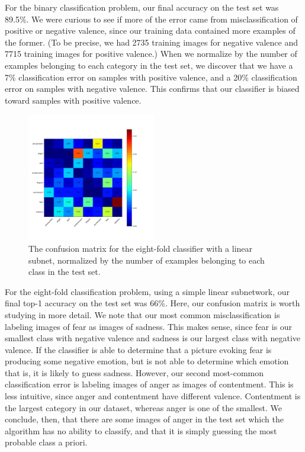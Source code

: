 \documentclass[10pt,twocolumn,letterpaper]{article}
\begin{document}
For the binary classification problem, our final accuracy on the test set was 89.5\%. We were curious to see if more of the error came from misclassification of positive or negative valence, since our training data contained more examples of the former. (To be precise, we had 2735 training images for negative valence and 7715 training images for positive valence.) When we normalize by the number of examples belonging to each category in the test set, we discover that we have a 7\% classification error on samples with positive valence, and a 20\% classification error on samples with negative valence. This confirms that our classifier is biased toward samples with positive valence.

\begin{figure}
\centering
\includegraphics[width=0.5\textwidth]{normalized_confusion_matrix_8_classes_no_hidden.png}
\caption{The confusion matrix for the eight-fold classifier with a linear subnet, normalized by the number of examples belonging to each class in the test set.}
\end{figure}

For the eight-fold classification problem, using a simple linear subnetwork, our final top-1 accuracy on the test set was 66\%. Here, our confusion matrix is worth studying in more detail. We note that our most common misclassification is labeling images of fear as images of sadness. This makes sense, since fear is our smallest class with negative valence and sadness is our largest class with negative valence. If the classifier is able to determine that a picture evoking fear is producing some negative emotion, but is not able to determine which emotion that is, it is likely to guess sadness. However, our second most-common classification error is labeling images of anger as images of contentment. This is less intuitive, since anger and contentment have different valence. Contentment is the largest category in our dataset, whereas anger is one of the smallest. We conclude, then, that there are some images of anger in the test set which the algorithm has no ability to classify, and that it is simply guessing the most probable class a priori.
\end{document}
